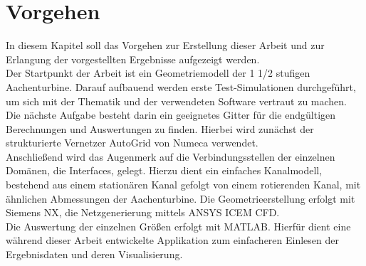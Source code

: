 \chapter{Vorgehen}
In diesem Kapitel soll das Vorgehen zur Erstellung dieser Arbeit und zur Erlangung der vorgestellten Ergebnisse aufgezeigt werden. \\
Der Startpunkt der Arbeit ist ein Geometriemodell der 1 1/2 stufigen Aachenturbine. Darauf aufbauend werden erste Test-Simulationen durchgeführt, um sich mit der Thematik und der verwendeten Software vertraut zu machen. Die nächste Aufgabe besteht darin ein geeignetes Gitter für die endgültigen Berechnungen und Auswertungen zu finden. Hierbei wird zunächst der strukturierte Vernetzer AutoGrid von Numeca verwendet.\\
Anschließend wird das Augenmerk auf die Verbindungsstellen der einzelnen Domänen, die Interfaces, gelegt. Hierzu dient ein einfaches Kanalmodell, bestehend aus einem stationären Kanal gefolgt von einem rotierenden Kanal, mit ähnlichen Abmessungen der Aachenturbine. Die Geometrieerstellung erfolgt mit Siemens NX, die Netzgenerierung mittels ANSYS ICEM CFD.\\ 
Die Auswertung der einzelnen Größen erfolgt mit MATLAB. Hierfür dient eine während dieser Arbeit entwickelte Applikation zum einfacheren Einlesen der Ergebnisdaten und deren Visualisierung.    

